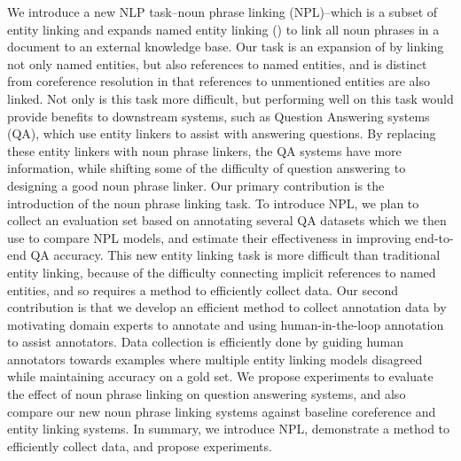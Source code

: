 We introduce a new NLP task--noun phrase linking (NPL)--which is a subset of entity linking and expands named entity linking (\nel{}) to link all noun phrases in a document to an external knowledge base. 
Our task is an expansion of \nel{} by linking not only named entities, but also references to named entities, and is distinct from coreference resolution in that references to unmentioned entities are also linked.
Not only is this task more difficult, but performing well on this task would provide benefits to downstream systems, such as Question Answering systems (QA), which use entity linkers to assist with answering questions. 
By replacing these entity linkers with noun phrase linkers, the QA systems have more information, while shifting some of the difficulty of question answering to designing a good noun phrase linker. 
Our primary contribution is the introduction of the noun phrase linking task. 
To introduce NPL, we plan to collect an evaluation set based on annotating several QA datasets which we then use to compare NPL models, and estimate their effectiveness in improving end-to-end QA accuracy.
This new entity linking task is more difficult than traditional entity linking, because of the difficulty connecting implicit references to named entities, and so requires a method to efficiently collect data. 
Our second contribution is that we develop an efficient method to collect annotation data by motivating domain experts to annotate and using human-in-the-loop annotation to assist annotators. 
Data collection is efficiently done by guiding human annotators towards examples where multiple entity linking models disagreed while maintaining accuracy on a gold set. 
We propose experiments to evaluate the effect of noun phrase linking on question answering systems, and also compare our new noun phrase linking systems against baseline coreference and entity linking systems. 
In summary, we introduce NPL, demonstrate a method to efficiently collect data, and propose experiments.
